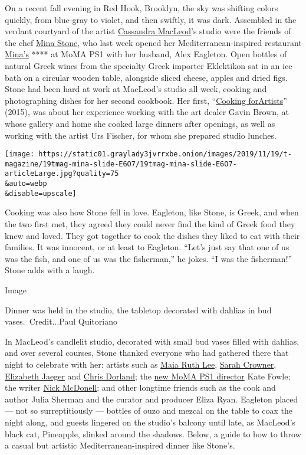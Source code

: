 On a recent fall evening in Red Hook, Brooklyn, the sky was shifting
colors quickly, from blue-gray to violet, and then swiftly, it was dark.
Assembled in the verdant courtyard of the artist
\href{http://cassandramacleod.com/}{Cassandra MacLeod}'s studio were the
friends of the chef
\href{https://www.nytimes3xbfgragh.onion/2015/01/30/t-magazine/mina-stone-cooking-for-artists-recipe.html}{Mina
Stone}, who last week opened her Mediterranean-inspired restaurant
\href{http://www.minas.nyc/}{Mina's} **** at MoMA PS1 with her husband,
Alex Eagleton. Open bottles of natural Greek wines from the specialty
Greek importer Eklektikon sat in an ice bath on a circular wooden table,
alongside sliced cheese, apples and dried figs. Stone had been hard at
work at MacLeod's studio all week, cooking and photographing dishes for
her second cookbook. Her first,
``\href{https://www.artbook.com/9780984721078.html}{Cooking
for}\textbf{\href{https://www.artbook.com/9780984721078.html}{}}\href{https://www.artbook.com/9780984721078.html}{Artists}''
(2015), was about her experience working with the art dealer Gavin
Brown, at whose gallery and home she cooked large dinners after
openings, as well as working with the artist Urs Fischer, for whom she
prepared studio lunches.

\texttt{[image: https://static01.graylady3jvrrxbe.onion/images/2019/11/19/t-magazine/19tmag-mina-slide-E6O7/19tmag-mina-slide-E6O7-articleLarge.jpg?quality=75\\\&auto=webp\\\&disable=upscale]}

Cooking was also how Stone fell in love. Eagleton, like Stone, is Greek,
and when the two first met, they agreed they could never find the kind
of Greek food they knew and loved. They got together to cook the dishes
they liked to eat with their families. It was innocent, or at least to
Eagleton. ``Let's just say that one of us was the fish, and one of us
was the fisherman,'' he jokes. ``I was the fisherman!'' Stone adds with
a laugh.

Image

Dinner was held in the studio, the tabletop decorated with dahlias in
bud vases.~Credit...Paul Quitoriano

In MacLeod's candlelit studio, decorated with small bud vases filled
with dahlias, and over several courses, Stone thanked everyone who had
gathered there that night to celebrate with her: artists such as
\href{https://www.maiaruthlee.club/}{Maia Ruth Lee},
\href{https://caseykaplangallery.com/artists/crowner/}{Sarah Crowner},
\href{http://www.elizabethjaeger.com/}{Elizabeth Jaeger} and
\href{http://chris-dorland.com/}{Chris Dorland}; the
\href{https://www.nytimes3xbfgragh.onion/2019/06/26/arts/design/kate-fowle-moma-ps1-director.html}{new
MoMA PS1 director} Kate Fowle; the writer
\href{http://www.nickmcdonell.com/}{Nick McDonell}; and other longtime
friends such as the cook and author Julia Sherman and the curator and
producer Eliza Ryan. Eagleton placed --- not so surreptitiously ---
bottles of ouzo and mezcal on the table to coax the night along, and
guests lingered on the studio's balcony until late, as MacLeod's black
cat, Pineapple, slinked around the shadows. Below, a guide to how to
throw a casual but artistic Mediterranean-inspired dinner like Stone's.

